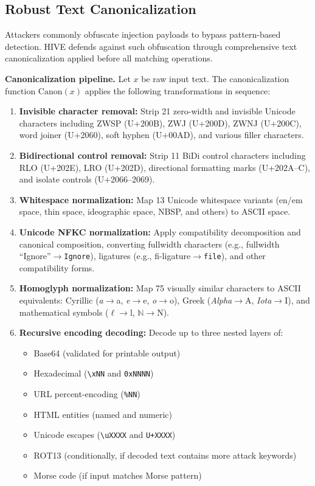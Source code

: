 \documentclass[manuscript,screen,review]{acmart}
\begin{document}
\subsection{Robust Text Canonicalization}
\label{sec:canonicalization}

Attackers commonly obfuscate injection payloads to bypass pattern-based detection. HIVE defends against such obfuscation through comprehensive text canonicalization applied before all matching operations.

\textbf{Canonicalization pipeline.} Let $x$ be raw input text. The canonicalization function $\mathrm{Canon}(x)$ applies the following transformations in sequence:

\begin{enumerate}
\item \textbf{Invisible character removal:} Strip 21 zero-width and invisible Unicode characters including ZWSP (U+200B), ZWJ (U+200D), ZWNJ (U+200C), word joiner (U+2060), soft hyphen (U+00AD), and various filler characters.

\item \textbf{Bidirectional control removal:} Strip 11 BiDi control characters including RLO (U+202E), LRO (U+202D), directional formatting marks (U+202A--C), and isolate controls (U+2066--2069).

\item \textbf{Whitespace normalization:} Map 13 Unicode whitespace variants (en/em space, thin space, ideographic space, NBSP, and others) to ASCII space.

\item \textbf{Unicode NFKC normalization:} Apply compatibility decomposition and canonical composition, converting fullwidth characters (e.g., fullwidth ``Ignore''$\to$\texttt{Ignore}), ligatures (e.g., fi-ligature$\to$\texttt{file}), and other compatibility forms.

\item \textbf{Homoglyph normalization:} Map 75 visually similar characters to ASCII equivalents: Cyrillic (\textit{a}$\to$a, \textit{e}$\to$e, \textit{o}$\to$o), Greek (\textit{Alpha}$\to$A, \textit{Iota}$\to$I), and mathematical symbols ($\ell$$\to$l, $\mathbb{N}$$\to$N).

\item \textbf{Recursive encoding decoding:} Decode up to three nested layers of:
    \begin{itemize}
    \item Base64 (validated for printable output)
    \item Hexadecimal (\texttt{\textbackslash xNN} and \texttt{0xNNNN})
    \item URL percent-encoding (\texttt{\%NN})
    \item HTML entities (named and numeric)
    \item Unicode escapes (\texttt{\textbackslash uXXXX} and \texttt{U+XXXX})
    \item ROT13 (conditionally, if decoded text contains more attack keywords)
    \item Morse code (if input matches Morse pattern)
    \end{itemize}


\end{enumerate}
\end{document}

